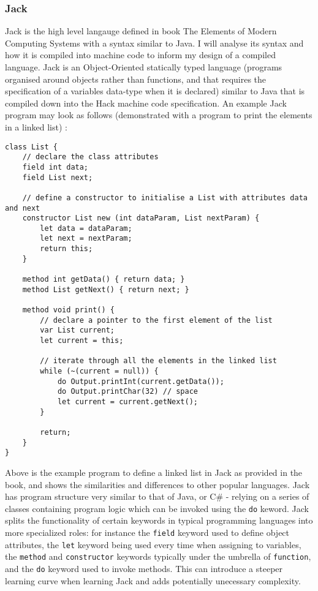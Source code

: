 \subsubsection{Jack}
Jack is the high level langauge defined in book The Elements of Modern Computing Systems \textcite{EOCS} with a syntax similar to Java. I will analyse its syntax and how it is compiled into machine code to inform my design of a compiled language. Jack is an Object-Oriented statically typed language (programs organised around objects rather than functions, and that requires the specification of a variables data-type when it is declared) similar to Java that is compiled down into the Hack machine code specification. An example Jack program may look as follows (demonstrated with a program to print the elements in a linked list) \textcite{EOCS}:
\begin{lstlisting}
class List {
    // declare the class attributes
    field int data;
    field List next;

    // define a constructor to initialise a List with attributes data and next
    constructor List new (int dataParam, List nextParam) {
        let data = dataParam;
        let next = nextParam;
        return this;
    }

    method int getData() { return data; }
    method List getNext() { return next; }

    method void print() {
        // declare a pointer to the first element of the list
        var List current;
        let current = this;

        // iterate through all the elements in the linked list
        while (~(current = null)) {
            do Output.printInt(current.getData());
            do Output.printChar(32) // space
            let current = current.getNext();
        }

        return;
    }
}
\end{lstlisting}


Above is the example program to define a linked list in Jack as provided in the book, and shows the similarities and differences to other popular languages. Jack has program structure very similar to that of Java, or C\# - relying on a series of classes containing program logic which can be invoked using the \texttt{do} keword. Jack splits the functionality of certain keywords in typical programming languages into more specialized roles: for instance the \texttt{field} keyword used to define object attributes, the \texttt{let} keyword being used every time when assigning to variables, the \texttt{method} and \texttt{constructor} keywords typically under the umbrella of \texttt{function}, and the \texttt{do} keyword used to invoke methods. This can introduce a steeper learning curve when learning Jack and adds potentially unecessary complexity.

